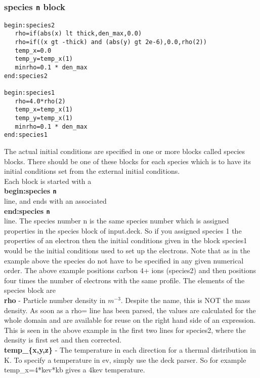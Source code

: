 \documentclass[12pt,a4paper]{article}
\newcommand{\emphtext}{\color{warwickdark} \fontfamily{phv}\selectfont\Large\bf}
\newcommand{\boxverbatim}[1]{\begin{Verbatim}[obeytabs=true,frame=single,
  framerule=0.5mm,rulecolor=\color{warwickmid},formatcom=\color{black},label=#1]}
\newcommand{\inlinecode}[1]{{\color{warwickred} \bf\texttt{#1}}}
\newcommand{\inlineemph}[1]{{\color{warwicklight} \bf{#1}}}
\begin{document}
\subsubsection{\inlineemph{species\inlinecode{n}} block}
\boxverbatim{species{\it n} block}
begin:species2
   rho=if(abs(x) lt thick,den_max,0.0)
   rho=if((x gt -thick) and (abs(y) gt 2e-6),0.0,rho(2))
   temp_x=0.0
   temp_y=temp_x(1)
   minrho=0.1 * den_max
end:species2

begin:species1
   rho=4.0*rho(2)
   temp_x=temp_x(1)
   temp_y=temp_x(1)
   minrho=0.1 * den_max
end:species1
\end{Verbatim}

The actual initial conditions are specified in one or more blocks called
species blocks. There should be one of these blocks for each species which is
to have its initial conditions set from the external initial conditions.\\

Each block is started with a\\

{\emphtext begin:species\inlinecode{n}}\\

line, and ends with an associated \\

{\emphtext end:species\inlinecode{n}}\\

line. The species number n is the same species number which is assigned
properties in the species block of input.deck. So if you assigned species 1 the
properties of an electron then the initial conditions given in the block
species1 would be the initial conditions used to set up the electrons. Note
that as in the example above the species do not have to be specified in any
given numerical order. The above example positions carbon 4+ ions (species2)
and then positions four times the number of electrons with the same
profile. The elements of the species block are\\

{\emphtext rho} - Particle number density in $m^{-3}$. Despite the name, this
is NOT the mass density. As soon as a rho= line has been parsed, the values are
calculated for the whole domain and are available for reuse on the right hand
side of an expression. This is seen in the above example in the first two lines
for species2, where the density is first set and then corrected.\\

{\emphtext temp\_\{x,y,z\}} - The temperature in each direction for a thermal
distribution in K. To specify a temperature in ev, simply use the deck
parser. So for example temp\_x=4*kev*kb gives a 4kev temperature.\\
\end{document}

